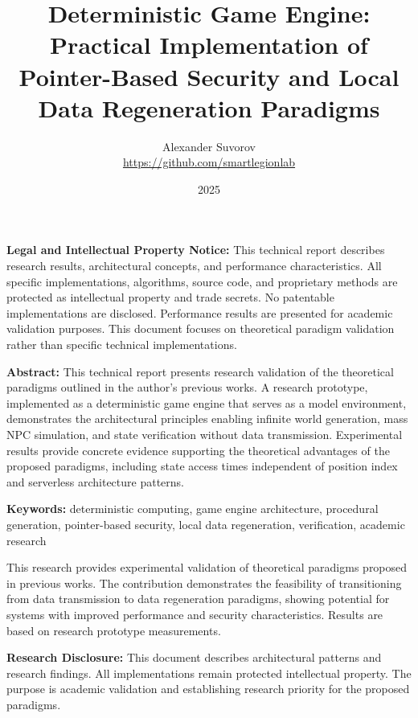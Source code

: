 \documentclass[14pt, a4paper]{extarticle}
\title{Deterministic Game Engine: Practical Implementation of Pointer-Based Security and Local Data Regeneration Paradigms}
\author{Alexander Suvorov \\ \url{https://github.com/smartlegionlab}}
\date{2025}
\begin{document}
\maketitle

\begin{legalbox}
\textbf{Legal and Intellectual Property Notice:} This technical report describes research results, architectural concepts, and performance characteristics. All specific implementations, algorithms, source code, and proprietary methods are protected as intellectual property and trade secrets. No patentable implementations are disclosed. Performance results are presented for academic validation purposes. This document focuses on theoretical paradigm validation rather than specific technical implementations.
\end{legalbox}

\begin{summarybox}
\textbf{Abstract:} This technical report presents research validation of the theoretical paradigms outlined in the author's previous works. A research prototype, implemented as a deterministic game engine that serves as a model environment, demonstrates the architectural principles enabling infinite world generation, mass NPC simulation, and state verification without data transmission. Experimental results provide concrete evidence supporting the theoretical advantages of the proposed paradigms, including state access times independent of position index and serverless architecture patterns.
\end{summarybox}

\textbf{Keywords:} deterministic computing, game engine architecture, procedural generation, pointer-based security, local data regeneration, verification, academic research

\begin{importantbox}
This research provides experimental validation of theoretical paradigms proposed in previous works. The contribution demonstrates the feasibility of transitioning from data transmission to data regeneration paradigms, showing potential for systems with improved performance and security characteristics. Results are based on research prototype measurements.
\end{importantbox}

\begin{infobox}
\textbf{Research Disclosure:} This document describes architectural patterns and research findings. All implementations remain protected intellectual property. The purpose is academic validation and establishing research priority for the proposed paradigms.
\end{infobox}
\end{document}
